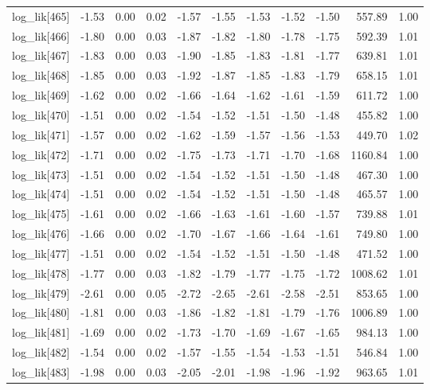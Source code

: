 \begin{table}[ht]
\begin{tabular}{rrrrrrrrrrr}
  log\_lik[465] & -1.53 & 0.00 & 0.02 & -1.57 & -1.55 & -1.53 & -1.52 & -1.50 & 557.89 & 1.00 \\ 
  log\_lik[466] & -1.80 & 0.00 & 0.03 & -1.87 & -1.82 & -1.80 & -1.78 & -1.75 & 592.39 & 1.01 \\ 
  log\_lik[467] & -1.83 & 0.00 & 0.03 & -1.90 & -1.85 & -1.83 & -1.81 & -1.77 & 639.81 & 1.01 \\ 
  log\_lik[468] & -1.85 & 0.00 & 0.03 & -1.92 & -1.87 & -1.85 & -1.83 & -1.79 & 658.15 & 1.01 \\ 
  log\_lik[469] & -1.62 & 0.00 & 0.02 & -1.66 & -1.64 & -1.62 & -1.61 & -1.59 & 611.72 & 1.00 \\ 
  log\_lik[470] & -1.51 & 0.00 & 0.02 & -1.54 & -1.52 & -1.51 & -1.50 & -1.48 & 455.82 & 1.00 \\ 
  log\_lik[471] & -1.57 & 0.00 & 0.02 & -1.62 & -1.59 & -1.57 & -1.56 & -1.53 & 449.70 & 1.02 \\ 
  log\_lik[472] & -1.71 & 0.00 & 0.02 & -1.75 & -1.73 & -1.71 & -1.70 & -1.68 & 1160.84 & 1.00 \\ 
  log\_lik[473] & -1.51 & 0.00 & 0.02 & -1.54 & -1.52 & -1.51 & -1.50 & -1.48 & 467.30 & 1.00 \\ 
  log\_lik[474] & -1.51 & 0.00 & 0.02 & -1.54 & -1.52 & -1.51 & -1.50 & -1.48 & 465.57 & 1.00 \\ 
  log\_lik[475] & -1.61 & 0.00 & 0.02 & -1.66 & -1.63 & -1.61 & -1.60 & -1.57 & 739.88 & 1.01 \\ 
  log\_lik[476] & -1.66 & 0.00 & 0.02 & -1.70 & -1.67 & -1.66 & -1.64 & -1.61 & 749.80 & 1.00 \\ 
  log\_lik[477] & -1.51 & 0.00 & 0.02 & -1.54 & -1.52 & -1.51 & -1.50 & -1.48 & 471.52 & 1.00 \\ 
  log\_lik[478] & -1.77 & 0.00 & 0.03 & -1.82 & -1.79 & -1.77 & -1.75 & -1.72 & 1008.62 & 1.01 \\ 
  log\_lik[479] & -2.61 & 0.00 & 0.05 & -2.72 & -2.65 & -2.61 & -2.58 & -2.51 & 853.65 & 1.00 \\ 
  log\_lik[480] & -1.81 & 0.00 & 0.03 & -1.86 & -1.82 & -1.81 & -1.79 & -1.76 & 1006.89 & 1.00 \\ 
  log\_lik[481] & -1.69 & 0.00 & 0.02 & -1.73 & -1.70 & -1.69 & -1.67 & -1.65 & 984.13 & 1.00 \\ 
  log\_lik[482] & -1.54 & 0.00 & 0.02 & -1.57 & -1.55 & -1.54 & -1.53 & -1.51 & 546.84 & 1.00 \\ 
  log\_lik[483] & -1.98 & 0.00 & 0.03 & -2.05 & -2.01 & -1.98 & -1.96 & -1.92 & 963.65 & 1.01 \\ 

\end{tabular}
\end{table}
